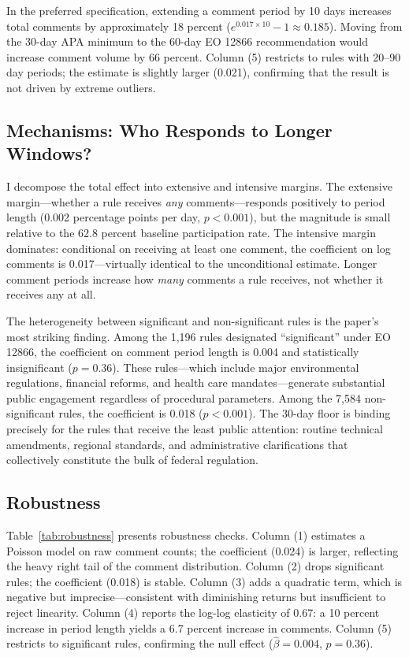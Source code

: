 \documentclass[12pt]{article}
\begin{document}
In the preferred specification, extending a comment period by 10 days increases total comments by approximately 18 percent ($e^{0.017 \times 10} - 1 \approx 0.185$). Moving from the 30-day APA minimum to the 60-day EO 12866 recommendation would increase comment volume by 66 percent. Column (5) restricts to rules with 20--90 day periods; the estimate is slightly larger (0.021), confirming that the result is not driven by extreme outliers.

\subsection{Mechanisms: Who Responds to Longer Windows?}

I decompose the total effect into extensive and intensive margins. The extensive margin---whether a rule receives \textit{any} comments---responds positively to period length (0.002 percentage points per day, $p < 0.001$), but the magnitude is small relative to the 62.8 percent baseline participation rate. The intensive margin dominates: conditional on receiving at least one comment, the coefficient on log comments is 0.017---virtually identical to the unconditional estimate. Longer comment periods increase how \textit{many} comments a rule receives, not whether it receives any at all.

The heterogeneity between significant and non-significant rules is the paper's most striking finding. Among the 1,196 rules designated ``significant'' under EO 12866, the coefficient on comment period length is 0.004 and statistically insignificant ($p = 0.36$). These rules---which include major environmental regulations, financial reforms, and health care mandates---generate substantial public engagement regardless of procedural parameters. Among the 7,584 non-significant rules, the coefficient is 0.018 ($p < 0.001$). The 30-day floor is binding precisely for the rules that receive the least public attention: routine technical amendments, regional standards, and administrative clarifications that collectively constitute the bulk of federal regulation.

\subsection{Robustness}



Table~\ref{tab:robustness} presents robustness checks. Column (1) estimates a Poisson model on raw comment counts; the coefficient (0.024) is larger, reflecting the heavy right tail of the comment distribution. Column (2) drops significant rules; the coefficient (0.018) is stable. Column (3) adds a quadratic term, which is negative but imprecise---consistent with diminishing returns but insufficient to reject linearity. Column (4) reports the log-log elasticity of 0.67: a 10 percent increase in period length yields a 6.7 percent increase in comments. Column (5) restricts to significant rules, confirming the null effect ($\hat{\beta} = 0.004$, $p = 0.36$).
\end{document}

